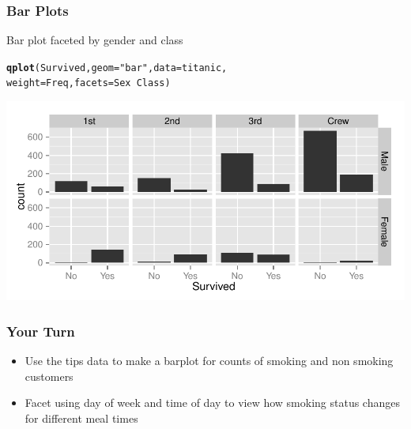 \documentclass{beamer}\usepackage[]{graphicx}\usepackage[]{color}
\makeatletter
\newcommand{\hlstr}[1]{\textcolor[rgb]{0.192,0.494,0.8}{#1}}%
\newcommand{\hlopt}[1]{\textcolor[rgb]{0,0,0}{#1}}%
\newcommand{\hlstd}[1]{\textcolor[rgb]{0.345,0.345,0.345}{#1}}%
\newcommand{\hlkwc}[1]{\textcolor[rgb]{0.333,0.667,0.333}{#1}}%
\newcommand{\hlkwd}[1]{\textcolor[rgb]{0.737,0.353,0.396}{\textbf{#1}}}%
\newenvironment{kframe}{%
 \def\at@end@of@kframe{}%
 \ifinner\ifhmode%
  \def\at@end@of@kframe{\end{minipage}}%
  \begin{minipage}{\columnwidth}%
 \fi\fi%
 \def\FrameCommand##1{\hskip\@totalleftmargin \hskip-\fboxsep
 \colorbox{shadecolor}{##1}\hskip-\fboxsep
     \hskip-\linewidth \hskip-\@totalleftmargin \hskip\columnwidth}%
 \MakeFramed {\advance\hsize-\width
   \@totalleftmargin\z@ \linewidth\hsize
   \@setminipage}}%
 {\par\unskip\endMakeFramed%
 \at@end@of@kframe}
\newenvironment{knitrout}{}{} %
\makeatother
\begin{document}

\begin{frame}[fragile]
\frametitle{Bar Plots}
    
Bar plot faceted by gender and class
    
\footnotesize
\begin{knitrout}\footnotesize
{}\color{fgcolor}\begin{kframe}
\begin{alltt}
\hlkwd{qplot}\hlstd{(Survived,} \hlkwc{geom}\hlstd{=}\hlstr{"bar"}\hlstd{,} \hlkwc{data}\hlstd{=titanic,}
                        \hlkwc{weight}\hlstd{=Freq,} \hlkwc{facets}\hlstd{=Sex}\hlopt{~}\hlstd{Class)}
\end{alltt}
\end{kframe}

{\centering \includegraphics[width=.9\linewidth]{figure/kdiamondbar2} 

}



\end{knitrout}
\normalsize
\end{frame}



\begin{frame}
\frametitle{Your Turn}

\begin{itemize}
  \item Use the tips data to make a barplot for counts of smoking and non smoking customers\medskip
  \item Facet using day of week and time of day to view how smoking status changes for different meal times
\end{itemize}

\end{frame}
\end{document}
